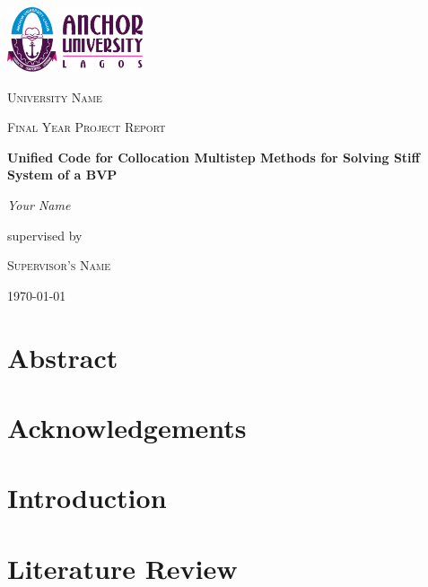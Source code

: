 \documentclass[12pt, a4paper, twoside]{report}
\begin{document}
\begin{titlepage}
    \centering
    \vspace*{1cm}
    \includegraphics[width=0.3\textwidth]{aul_logo.png}\par
    \vspace{1.5cm}
    {\scshape\LARGE University Name \par}
    \vspace{1cm}
    {\scshape\Large Final Year Project Report\par}
    \vspace{1.5cm}
    {\huge\bfseries Unified Code for Collocation Multistep Methods for Solving Stiff System of a BVP\par}
    \vspace{2cm}
    {\Large\itshape Your Name\par}
    \vfill
    supervised by\par
    \textsc{Supervisor's Name}

    \vfill

    {\large \today\par}
\end{titlepage}

\chapter*{Abstract}
\lipsum[1]

\chapter*{Acknowledgements}
\lipsum[2]

\tableofcontents

\listoffigures
\listoftables

\chapter{Introduction}
\lipsum[3]

\chapter{Literature Review}
\lipsum[4]
\end{document}
